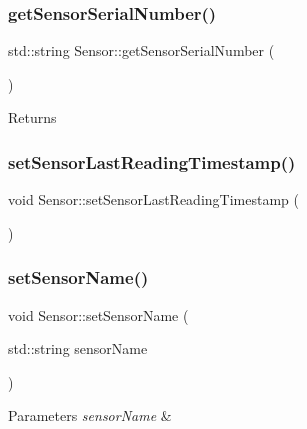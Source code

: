\subsubsection{\texorpdfstring{get\+Sensor\+Serial\+Number()}{getSensorSerialNumber()}}
{\footnotesize\ttfamily std\+::string Sensor\+::get\+Sensor\+Serial\+Number (\begin{DoxyParamCaption}{ }\end{DoxyParamCaption})}





\begin{DoxyReturn}{Returns}

\end{DoxyReturn}
\mbox{\label{class_sensor_ab6e5cf0accf41d18ddb4dc9e489ba1ef}} 
\subsubsection{\texorpdfstring{set\+Sensor\+Last\+Reading\+Timestamp()}{setSensorLastReadingTimestamp()}}
{\footnotesize\ttfamily void Sensor\+::set\+Sensor\+Last\+Reading\+Timestamp (\begin{DoxyParamCaption}{ }\end{DoxyParamCaption})}





\mbox{\label{class_sensor_add1838a85fc68b6c0b61a4a233e5fcaf}} 
\subsubsection{\texorpdfstring{set\+Sensor\+Name()}{setSensorName()}}
{\footnotesize\ttfamily void Sensor\+::set\+Sensor\+Name (\begin{DoxyParamCaption}\item[{std\+::string}]{sensor\+Name }\end{DoxyParamCaption})}






\begin{DoxyParams}{Parameters}
{\em sensor\+Name} & \\
\hline
\end{DoxyParams}
\mbox{\label{class_sensor_aa89b192e3203c85e62599c6239f01225}} 
